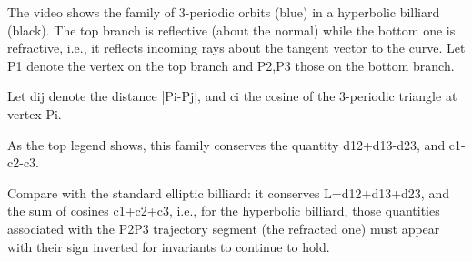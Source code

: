 The video shows the family of 3-periodic orbits (blue) in a hyperbolic billiard (black). The top branch is reflective (about the normal) while the bottom one is refractive, i.e., it reflects incoming rays about the tangent vector to the curve. Let P1 denote the vertex on the top branch and P2,P3 those on the bottom branch. 

Let dij denote the distance |Pi-Pj|, and ci the cosine of the 3-periodic triangle at vertex Pi.

As the top legend shows, this family conserves the quantity d12+d13-d23, and c1-c2-c3.

Compare with the standard elliptic billiard: it conserves L=d12+d13+d23, and the sum of cosines c1+c2+c3, i.e., for the hyperbolic billiard, those quantities associated with the P2P3 trajectory segment (the refracted one) must appear with their sign inverted for invariants to continue to hold.